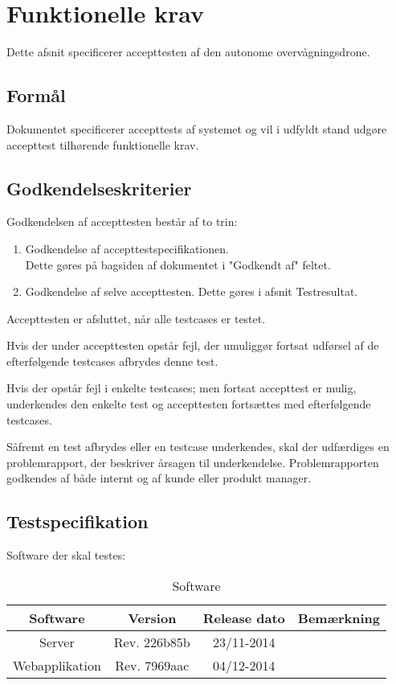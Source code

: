 \chapter{Funktionelle krav}
Dette afsnit specificerer accepttesten af den autonome overvågningsdrone.

\section*{Formål}
Dokumentet specificerer accepttests af systemet og vil i udfyldt stand udgøre accepttest tilhørende funktionelle krav. 

\section*{Godkendelseskriterier}
Godkendelsen af accepttesten består af to trin:

\begin{enumerate}
	\item Godkendelse af accepttestspecifikationen. \\
	Dette gøres på bagsiden af dokumentet i "Godkendt af" feltet.

	\item Godkendelse af selve accepttesten. Dette gøres i afsnit Testresultat. 
\end{enumerate}

Accepttesten er afsluttet, når alle testcases er testet.

Hvis der under accepttesten opstår fejl, der umuliggør fortsat udførsel af de efterfølgende testcases afbrydes denne test.

Hvis der opstår fejl i enkelte testcases; men fortsat accepttest er mulig, underkendes den enkelte test og accepttesten fortsættes med efterfølgende testcases.

Såfremt en test afbrydes eller en testcase underkendes, skal der udfærdiges en problemrapport, der beskriver årsagen til underkendelse. Problemrapporten godkendes af både internt og af kunde eller produkt manager.

\newpage

\section*{Testspecifikation}
Software der skal testes:
\begin{table}[H]
	\centering
		\begin{tabular}{|c|c|c|c|}
			\hline
			Software & Version & Release dato & Bemærkning \\ \hline
			Server & Rev. 226b85b & 23/11-2014 & \\ \hline			
			Webapplikation & Rev. 7969aac & 04/12-2014 &\\ \hline
		\end{tabular}
	\caption{Software}
\end{table}

